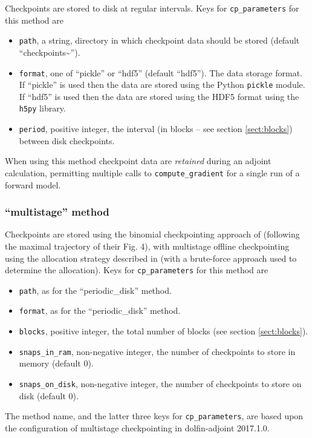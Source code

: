 \documentclass[11pt]{article}
\begin{document}
Checkpoints are stored to disk at regular intervals. Keys for
\texttt{cp\_parameters} for this method are
\begin{itemize}
  \item \texttt{path}, a string, directory in which checkpoint data should be
    stored (default ``checkpoints\textasciitilde'').
  \item \texttt{format}, one of ``pickle'' or ``hdf5'' (default ``hdf5''). The
    data storage format. If ``pickle'' is used then the data are stored using
    the Python \texttt{pickle} module. If ``hdf5'' is used then the data are
    stored using the HDF5 format \citep{hdf52021} using the \texttt{h5py}
    library.
  \item \texttt{period}, positive integer, the interval (in blocks -- see
    section \ref{sect:blocks}) between disk checkpoints.
\end{itemize}

When using this method checkpoint data are \emph{retained} during an adjoint
calculation, permitting multiple calls to \texttt{compute\_gradient} for a
single run of a forward model.

\subsubsection{``multistage'' method}

Checkpoints are stored using the binomial checkpointing approach of
\citet{griewank2000} (following the maximal trajectory of their Fig. 4), with
multistage offline checkpointing using the allocation strategy described in
\citet{stumm2009} (with a brute-force approach used to determine the
allocation). Keys for \texttt{cp\_parameters} for this method are
\begin{itemize}
  \item \texttt{path}, as for the ``periodic\_disk'' method.
  \item \texttt{format}, as for the ``periodic\_disk'' method.
  \item \texttt{blocks}, positive integer, the total number of blocks (see
    section \ref{sect:blocks}).
  \item \texttt{snaps\_in\_ram}, non-negative integer, the number of
    checkpoints to store in memory (default $0$).
  \item \texttt{snaps\_on\_disk}, non-negative integer, the number of
    checkpoints to store on disk (default $0$).
\end{itemize}
The method name, and the latter three keys for \texttt{cp\_parameters}, are
based upon the configuration of multistage checkpointing in dolfin-adjoint
2017.1.0.
\end{document}
